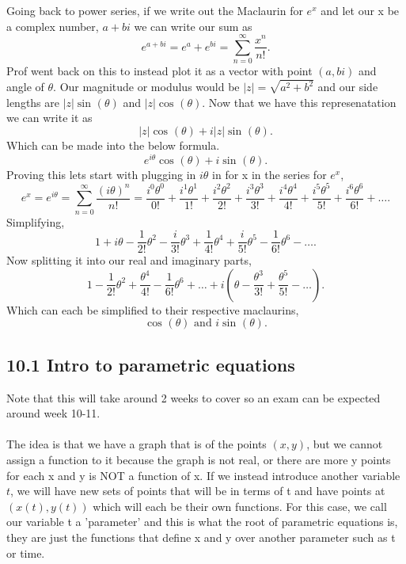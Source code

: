 Going back to power series, if we write out the Maclaurin for $ e^{ x } $ and let our x be a complex number, $ a+bi $ we can write our sum as 
\[
e^{ a+bi } = e^{ a }+e^{ bi }= \sum_{ n=0 } ^{ \infty } \frac{ x^{ n } }{ n! }
.\] 
Prof went back on this to instead plot it as a vector with point $ \left( a, bi \right)  $ and angle of $ \theta $. Our magnitude or modulus would be $ \left| z \right|=\sqrt{ a^2+b^2 }  $ and our side lengths are $ \left| z \right|\sin^{  } \left( \theta \right)  $ and $ \left| z \right|\cos^{  } \left( \theta \right)  $. Now that we have this represenatation we can write it as
\[
\left| z \right|\cos^{  } \left( \theta \right) +i \left| z \right|\sin^{  } \left( \theta \right) 
.\] 
Which can be made into the below formula. 
\[
e^{ i \theta } \cos^{  } \left( \theta \right) + i \sin^{  } \left( \theta \right) 
.\] 
Proving this lets start with plugging in $ i\theta $ in for x in the series for $ e^{ x } $,
\[
	e^{ x }=e^{ i\theta }= \sum_{ n=0 } ^{ \infty } \frac{ \left( i\theta \right) ^{ n } }{ n! } = \frac{ i^{ 0 }\theta^{ 0 } }{ 0! }+ \frac{ i^{ 1 }\theta^{ 1 } }{ 1! }+ \frac{ i^{ 2 }\theta^{ 2 } }{ 2! }+ \frac{ i^{ 3 }\theta^{ 3 } }{ 3! } + \frac{ i^{ 4 }\theta^{ 4 } }{ 4! }+ \frac{ i^{ 5 }\theta^{ 5 } }{ 5! } + \frac{ i^{ 6 }\theta^{ 6 } }{ 6! } + \ldots
.\] 
Simplifying,
\[
1+i\theta - \frac{ 1 }{ 2! } \theta^2 - \frac{ i }{ 3! } \theta^3 + \frac{ 1 }{ 4! } \theta^4 + \frac{ i }{ 5! } \theta^5 - \frac{ 1 }{ 6! } \theta^6 - \ldots
.\] 
Now splitting it into our real and imaginary parts,
\[
1-\frac{ 1 }{ 2! } \theta^2+\frac{ \theta^{ 4 } }{ 4! }-\frac{ 1 }{ 6! } \theta^{ 6 }+ \ldots + i\left( \theta -\frac{ \theta^{ 3 } }{ 3! }+\frac{ \theta^{ 5 } }{ 5! }-\ldots \right) 
.\] 
Which can each be simplified to their respective maclaurins,
\[
\cos^{  } \left( \theta \right) \text{ and }i\sin^{  } \left( \theta \right) 
.\] 

\subsection{10.1 Intro to parametric equations}%
\label{sub:10.1 Intro to parametric equations}
Note that this will take around 2 weeks to cover so an exam can be expected around week 10-11. \\ \\ 

The idea is that we have a graph that is of the points $ \left( x,y \right)  $, but we cannot assign a function to it because the graph is not real, or there are more y points for each x and y is NOT a function of x. If we instead introduce another variable $ t $, we will have new sets of points that will be in terms of t and have points at $ \left( x\left( t \right) , y\left( t \right)  \right)  $ which will each be their own functions. For this case, we call our variable t a 'parameter' and this is what the root of parametric equations is, they are just the functions that define x and y over another parameter such as t or time. 

